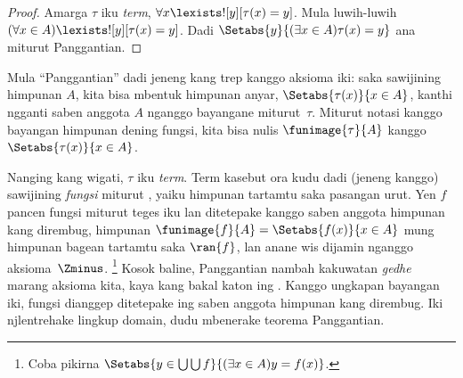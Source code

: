 \documentclass[../../../include/open-logic-section]{subfiles}
\begin{document}
\begin{proof}
Amarga $\tau$ iku \emph{term},
$\forall x \lexists![y][\tau(x) = y]$. Mula luwih-luwih
$(\forall x \in A)\lexists![y][\tau(x) = y]$.
Dadi $\Setabs{y}{(\exists x \in A)\tau(x) = y}$
ana miturut Panggantian.
\end{proof}
\noindent
Mula ``Panggantian'' dadi jeneng kang trep kanggo
aksioma iki: saka sawijining himpunan $A$, kita
bisa mbentuk himpunan anyar,
$\Setabs{\tau(x)}{x \in A}$, kanthi ngganti saben
anggota $A$ nganggo bayangane miturut~$\tau$.
Miturut notasi kanggo bayangan himpunan dening
fungsi, kita bisa nulis $\funimage{\tau}{A}$
kanggo $\Setabs{\tau(x)}{x \in A}$.

Nanging kang wigati, $\tau$ iku \emph{term}.
Term kasebut ora kudu dadi (jeneng kanggo) sawijining
\emph{fungsi} miturut ,
yaiku himpunan tartamtu saka pasangan urut.
Yen $f$ pancen fungsi miturut teges iku lan
ditetepake kanggo saben anggota himpunan kang
dirembug, himpunan
$\funimage{f}{A} = \Setabs{f(x)}{x \in A}$ mung
himpunan bagean tartamtu saka $\ran{f}$, lan
anane wis dijamin nganggo aksioma~$\Zminus$.
\footnote{Coba pikirna
$\Setabs{y \in \bigcup \bigcup f}{(\exists x \in A)y = f(x)}$.}
Kosok baline, Panggantian nambah kakuwatan
\emph{gedhe} marang aksioma kita, kaya kang bakal
katon ing .
Kanggo ungkapan bayangan iki, fungsi dianggep ditetepake ing saben anggota himpunan kang dirembug. Iki njlentrehake lingkup domain, dudu mbenerake teorema Panggantian.
\end{document}
